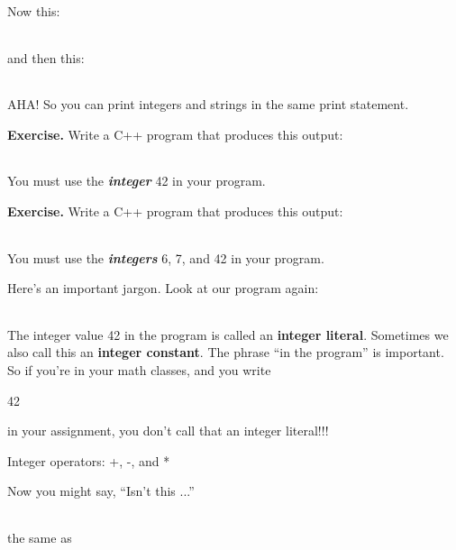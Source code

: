 \documentclass[
]{article}
\begin{document}
Now this:

\begin{longtable}[]{@{}@{}}
\toprule
\endhead
\bottomrule
\end{longtable}

and then this:

\begin{longtable}[]{@{}@{}}
\toprule
\endhead
\bottomrule
\end{longtable}

AHA! So you can print integers and strings in the same print statement.

\textbf{Exercise.} Write a C++ program that produces this output:

\begin{longtable}[]{@{}@{}}
\toprule
\endhead
\bottomrule
\end{longtable}

You must use the \emph{\textbf{integer}} 42 in your program.

\textbf{Exercise.} Write a C++ program that produces this output:

\begin{longtable}[]{@{}@{}}
\toprule
\endhead
\bottomrule
\end{longtable}

You must use the \emph{\textbf{integers}} 6, 7, and 42 in your program.

Here's an important jargon. Look at our program again:

\begin{longtable}[]{@{}@{}}
\toprule
\endhead
\bottomrule
\end{longtable}

The integer value 42 in the program is called an \textbf{integer
literal}. Sometimes we also call this an \textbf{integer constant}. The
phrase ``in the program'' is important. So if you're in your math
classes, and you write

42

in your assignment, you don't call that an integer literal!!!

Integer operators: +, -, and *

Now you might say, ``Isn't this ...''

\begin{longtable}[]{@{}@{}}
\toprule
\endhead
\bottomrule
\end{longtable}

the same as

\begin{longtable}[]{@{}@{}}
\toprule
\endhead
\bottomrule
\end{longtable}
\end{document}
